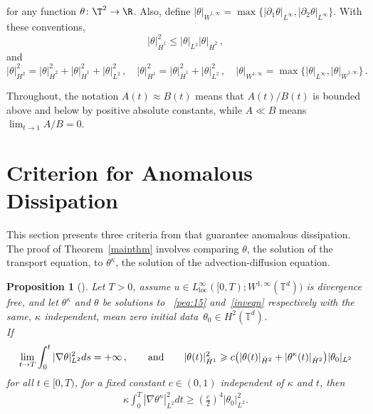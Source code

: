 \documentclass[12pt]{report}   %
\renewcommand{\le}{\leqslant}
\renewcommand{\ge}{\geqslant}
\numberwithin{equation}{section}
\theoremstyle{plain}
\newtheorem{proposition}[lemma]{Proposition}
\theoremstyle{definition}
\theoremstyle{remark}
\DeclarePairedDelimiter{\abs}{\lvert}{\rvert}
\DeclarePairedDelimiter{\paren}{(}{)}
\newcommand{\rd}{\partial}
\newcommand{\nb}{\nabla}
\begin{document}
 for any function $\theta \colon \T^2 \to \R$.
 Also, define 
   $|\theta|_{\dot{W}^{1,\infty}}
       =
       \max\{ |\rd_1\theta|_{L^\infty} , |\rd_2\theta|_{L^\infty} \}
   $.
 With these conventions, 
 \begin{equation*}
   |\theta |_{\dot{H}^1}^2 \le |\theta |_{L^2}|\theta |_{\dot{H}^2} \,,
 \end{equation*}
 and
 \begin{equation*}
   |\theta|_{H^2}^2 = |\theta|_{\dot{H}^2}^2+|\theta|_{\dot{H}^1}^2+|\theta|_{L^2}^2 \,,
   \quad |\theta|_{H^1}^2 =  |\theta|_{\dot{H}^1}^2+|\theta|_{L^2}^2\,,
   \quad |\theta|_{W^{1,\infty}}
     = \max\{ |\theta|_{L^\infty} , |\theta|_{\dot{W}^{1,\infty}} \}
   \,. 
 \end{equation*}
 
 Throughout, the notation $A(t) \approx B(t)$ means that $A(t)/B(t)$ is bounded above and below by positive absolute constants, while $A \ll B$ means $\lim_{t\to 1} A/B = 0$.
 \medskip
 
 
\section{Criterion for Anomalous Dissipation}
This section presents three criteria from \cite{DrivasElgindiEA22} that guarantee anomalous dissipation. The proof of Theorem~\ref{mainthm} involves comparing $\theta$, the solution of the transport equation, to $\theta^\kappa$, the solution of the advection-diffusion equation. \\

 \begin{proposition}[{\cite[Proposition~1.1]{DrivasElgindiEA22}}]\label{thm:criterion1}
 Let  $T > 0$, assume 
 $u \in L^\infty_\mathrm{loc} ([0, T); W^{1, \infty}(\mathbb{T}^d))$ is divergence free, and let $\theta^\kappa$ and $\theta$ be solutions to ~\eqref{peq:15} and~\eqref{inveqn} respectively with the same, $\kappa$ independent, mean zero initial data~$\theta_0 \in H^2(\mathbb{T}^d)$. \\
   If
   \begin{equation}\label{assumProp12}
     \lim_{t\rightarrow T}\int_0^t|\nabla\theta |_{L^2}^2ds=+\infty \,,
     \qquad\text{and}\qquad
     |\theta(t)|_{\dot{H}^1}^2
       \ge c \paren[\big]{
 	|\theta(t)|_{\dot{H}^2}+ |\theta^\kappa(t)|_{\dot{H}^2}
 	}|\theta_0|_{L^2}
   \end{equation}
   for all $t\in [0,T)$, for a fixed constant $c\in(0,1)$ independent of $\kappa$ and $t$,  then
   \begin{equation*}
   	\begin{split}
   	\kappa \int_0^T |\nb \theta^{\kappa}|_{L^2}^2 dt \ge  \left(\frac{c}{2}\right)^4 |\theta_0|_{L^2}^2.
   	\end{split}
   \end{equation*}
 \end{proposition}
 
\end{document}
